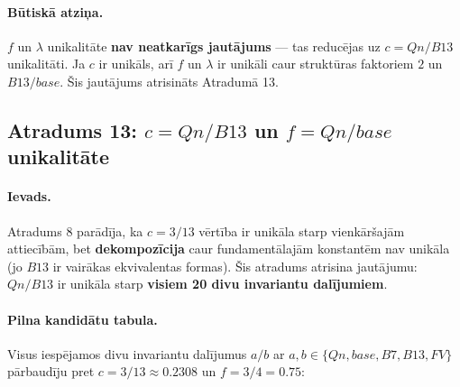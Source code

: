 \documentclass[12pt,a4paper]{article}
\begin{document}
\paragraph{Būtiskā atziņa.}
$f$ un $\lambda$ unikalitāte \textbf{nav neatkarīgs jautājums} — tas reducējas uz $c = Qn/B13$ unikalitāti. Ja $c$ ir unikāls, arī $f$ un $\lambda$ ir unikāli caur struktūras faktoriem $2$ un $B13/base$. Šis jautājums atrisināts Atradumā 13.

\subsection*{Atradums 13: $c = Qn/B13$ un $f = Qn/base$ unikalitāte}

\paragraph{Ievads.}
Atradums 8 parādīja, ka $c = 3/13$ vērtība ir unikāla starp vienkāršajām attiecībām, bet \textbf{dekompozīcija} caur fundamentālajām konstantēm nav unikāla (jo $B13$ ir vairākas ekvivalentas formas). Šis atradums atrisina jautājumu: $Qn/B13$ ir unikāla starp \textbf{visiem 20 divu invariantu dalījumiem}.

\paragraph{Pilna kandidātu tabula.}
Visus iespējamos divu invariantu dalījumus $a/b$ ar $a, b \in \{Qn, base, B7, B13, FV\}$ pārbaudīju pret $c = 3/13 \approx 0.2308$ un $f = 3/4 = 0.75$:
\end{document}
